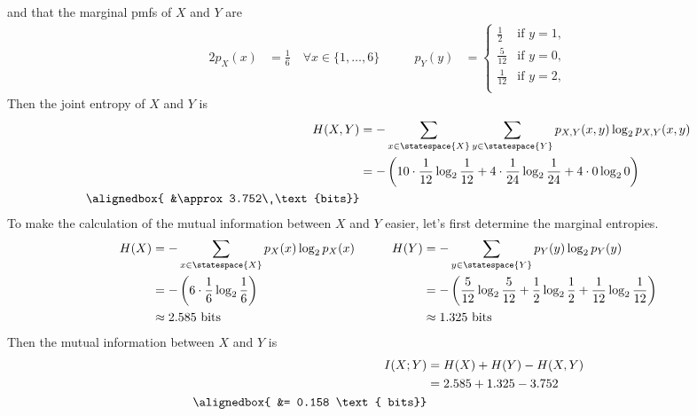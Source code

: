 \documentclass[
  coursecode={MTHE 474},
  assignmentname={Homework \homeworknumber},
  studentnumber=20053722,
  name={Bryan Hoang}
]{
  ltxanswer%
}
\begin{document}
\begin{questions}
\begin{solution}
\begin{equation*}
      \end{equation*}
      and that the marginal pmfs of \(X\) and \(Y\) are
      \begin{alignat*}{2}
        p_{X}(x) &= \frac{1}{6}\quad \forall x \in \{1, \dotsc, 6\} &\qquad p_{Y}(y) &= \begin{cases}
                                                                                          \frac{1}{2}  & \text{if } y = 1, \\
                                                                                          \frac{5}{12} & \text{if } y = 0, \\
                                                                                          \frac{1}{12} & \text{if } y = 2, \\
                                                                                        \end{cases}
      \end{alignat*}
      Then the joint entropy of \(X\) and \(Y\) is
      \begin{align*}
        H(X,Y)       &= -\sum_{x\in\statespace{X}}\sum_{y\in\statespace{Y}}{p_{X,Y}(x,y) \log_2 p_{X,Y}(x,y)}                                   \\
                     &= -\left(10 \cdot \frac{1}{12}\log_{2}\frac{1}{12} + 4 \cdot \frac{1}{24}\log_{2}\frac{1}{24} + 4 \cdot 0\log_{2}0\right) \\
        \alignedbox{ &\approx 3.752\ \text{bits}}                                                                                               \\
      \end{align*}
      To make the calculation of the mutual information between \(X\) and \(Y\) easier, let's first determine the marginal entropies.
      \begin{alignat*}{2}
        H(X) &= -\sum_{x\in\statespace{X}}{p_{X}(x) \log_2 p_{X}(x)} &\qquad H(Y) &= -\sum_{y\in\statespace{Y}}{p_{Y}(y) \log_2 p_{Y}(y)}                                                               \\
             &= -\left(6 \cdot \frac{1}{6}\log_{2}\frac{1}{6}\right) &            &= -\left(\frac{5}{12}\log_{2}\frac{5}{12} + \frac{1}{2}\log_{2}\frac{1}{2} + \frac{1}{12}\log_{2}\frac{1}{12}\right) \\
             &\approx 2.585\ \text{bits}                             &            &\approx 1.325\ \text{bits}
      \end{alignat*}
      Then the mutual information between \(X\) and \(Y\) is
      \begin{align*}
        I(X;Y)       &= H(X) + H(Y) - H(X,Y)  \\
                     &= 2.585 + 1.325 - 3.752 \\
        \alignedbox{ &= 0.158 \text{ bits}}   \\
      \end{align*}
    \end{solution}
  \end{questions}
\end{document}
